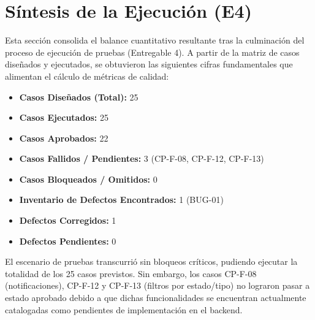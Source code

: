 \section{Síntesis de la Ejecución (E4)}
\label{sec:sintesis_ejecucion}

Esta sección consolida el balance cuantitativo resultante tras la culminación del proceso de ejecución de pruebas (Entregable 4). A partir de la matriz de casos diseñados y ejecutados, se obtuvieron las siguientes cifras fundamentales que alimentan el cálculo de métricas de calidad:

\begin{itemize}
    \item \textbf{Casos Diseñados (Total):} 25
    \item \textbf{Casos Ejecutados:} 25
    \item \textbf{Casos Aprobados:} 22
    \item \textbf{Casos Fallidos / Pendientes:} 3 (CP-F-08, CP-F-12, CP-F-13)
    \item \textbf{Casos Bloqueados / Omitidos:} 0
    \item \textbf{Inventario de Defectos Encontrados:} 1 (BUG-01)
    \item \textbf{Defectos Corregidos:} 1
    \item \textbf{Defectos Pendientes:} 0
\end{itemize}

El escenario de pruebas transcurrió sin bloqueos críticos, pudiendo ejecutar la totalidad de los 25 casos previstos. Sin embargo, los casos CP-F-08 (notificaciones), CP-F-12 y CP-F-13 (filtros por estado/tipo) no lograron pasar a estado aprobado debido a que dichas funcionalidades se encuentran actualmente catalogadas como pendientes de implementación en el backend.
